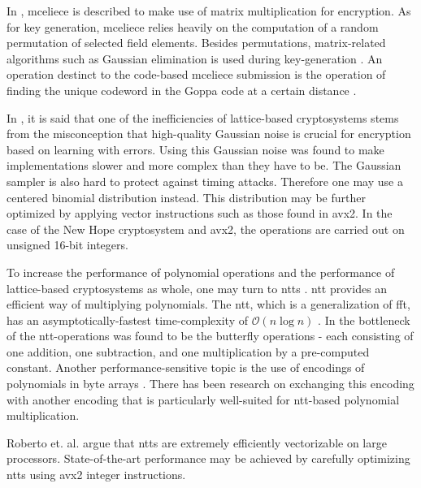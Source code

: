 
In \cite{wang2018}, \gls{mceliece} is described to make use of matrix multiplication for encryption. As for key generation, \gls{mceliece} relies heavily on the computation of a random permutation of selected field elements. Besides permutations, matrix-related algorithms such as Gaussian elimination is used during key-generation \cite{mceliece2020}. An operation destinct to the code-based \gls{mceliece} submission is the operation of finding the unique codeword in the Goppa code at a certain distance \cite{mceliece2020}.


In \cite{alkim2016}, it is said that one of the inefficiencies of lattice-based cryptosystems stems from the misconception that high-quality Gaussian noise is crucial for encryption based on learning with errors. Using this Gaussian noise was found to make implementations slower and more complex than they have to be. The Gaussian sampler is also hard to protect against timing attacks. Therefore one may use a centered binomial distribution instead. This distribution may be further optimized by applying vector instructions such as those found in \gls{avx2}. In the case of the New Hope cryptosystem and \gls{avx2}, the operations are carried out on unsigned 16-bit integers.

To increase the performance of polynomial operations and the performance of lattice-based cryptosystems as whole, one may turn to \glspl{ntt} \cite{alkim2016}. \gls{ntt} provides an efficient way of multiplying polynomials. The \gls{ntt}, which is a generalization of \gls{fft}, has an asymptotically-fastest time-complexity of $\mathcal{O}(n\log{}n)$ \cite{roy2020}. In \cite{alkim2016} the bottleneck of the \gls{ntt}-operations was found to be the butterfly operations - each consisting of one addition, one subtraction, and one multiplication by a pre-computed constant. Another performance-sensitive topic is the use of encodings of polynomials in byte arrays \cite{alkim2016}. There has been research on exchanging this encoding with another encoding that is particularly well-suited for \gls{ntt}-based polynomial multiplication.

Roberto et. al. \cite{kyber2021} argue that \glspl{ntt} are extremely efficiently vectorizable on large processors. State-of-the-art performance may be achieved by carefully optimizing \glspl{ntt} using \gls{avx2} integer instructions.

